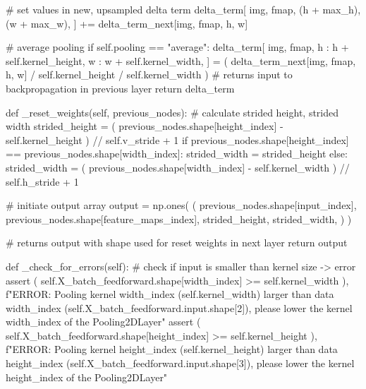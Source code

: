 \documentclass[%
oneside,                 %
final,                   %
10pt]{article}
\begin{document}
                            # set values in new, upsampled delta term
                            delta_term[
                                img,
                                fmap,
                                (h + max_h),
                                (w + max_w),
                            ] += delta_term_next[img, fmap, h, w]

                        # average pooling
                        if self.pooling == "average":
                            delta_term[
                                img,
                                fmap,
                                h : h + self.kernel_height,
                                w : w + self.kernel_width,
                            ] = (
                                delta_term_next[img, fmap, h, w]
                                / self.kernel_height
                                / self.kernel_width
                            )
        # returns input to backpropagation in previous layer
        return delta_term

    def _reset_weights(self, previous_nodes):
        # calculate strided height, strided width
        strided_height = (
            previous_nodes.shape[height_index] - self.kernel_height
        ) // self.v_stride + 1
        if previous_nodes.shape[height_index] == previous_nodes.shape[width_index]:
            strided_width = strided_height
        else:
            strided_width = (
                previous_nodes.shape[width_index] - self.kernel_width
            ) // self.h_stride + 1

        # initiate output array
        output = np.ones(
            (
                previous_nodes.shape[input_index],
                previous_nodes.shape[feature_maps_index],
                strided_height,
                strided_width,
            )
        )

        # returns output with shape used for reset weights in next layer
        return output

    def _check_for_errors(self):
        # check if input is smaller than kernel size -> error
        assert (
            self.X_batch_feedforward.shape[width_index] >= self.kernel_width
        ), f"ERROR: Pooling kernel width_index ({self.kernel_width}) larger than data width_index ({self.X_batch_feedforward.input.shape[2]}), please lower the kernel width_index of the Pooling2DLayer"
        assert (
            self.X_batch_feedforward.shape[height_index] >= self.kernel_height
        ), f"ERROR: Pooling kernel height_index ({self.kernel_height}) larger than data height_index ({self.X_batch_feedforward.input.shape[3]}), please lower the kernel height_index of the Pooling2DLayer"
\end{document}
